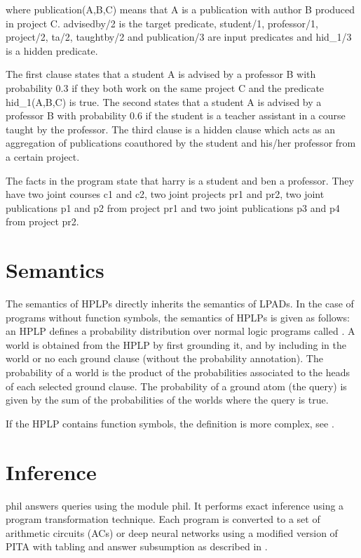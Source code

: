 \documentclass[letterpaper,10pt,english]{sphinxmanual}
\begin{document}
where publication(A,B,C) means that A is a publication with author B produced in project C. advisedby/2 is the target predicate, student/1, professor/1, project/2, ta/2, taughtby/2 and publication/3 are input predicates and hid\_1/3 is a hidden predicate.

The first clause states that a student A is advised by a professor B with probability 0.3 if they both work on the same project C and the predicate hid\_1(A,B,C) is true.
The second states that a student A is advised by a professor B with probability 0.6 if the student is a teacher assistant in a course taught by the professor.
The third clause is a hidden clause which acts as an aggregation of publications coauthored by the student and his/her professor from a certain project.

The facts in the program state that harry is a student and ben a professor. They have two joint courses c1 and c2, two joint projects pr1 and pr2, two joint publications p1 and p2 from project pr1 and two joint publications p3 and p4 from project pr2.


\chapter{Semantics}
\label{\detokenize{index:semantics}}
The semantics of HPLPs directly inherits the semantics of LPADs. In the case of programs without function symbols, the semantics of HPLPs is given as follows: an HPLP defines a probability distribution over normal logic programs called .
A world is obtained from the HPLP by first grounding it, and by including in the world or no each ground clause (without the probability annotation).
The probability of a world is the product of the probabilities associated to the heads of each selected ground clause.
The probability of a ground atom (the query) is given by the sum of the probabilities of the worlds where the query is true.

If the HPLP contains function symbols, the definition is more complex, see .


\chapter{Inference}
\label{\detokenize{index:inference}}
phil answers queries using the module phil. It performs exact inference using a program transformation technique.  Each program is converted to a set of arithmetic circuits (ACs) or deep neural networks using a modified version of PITA  with tabling and answer subsumption  as described in .
\end{document}
